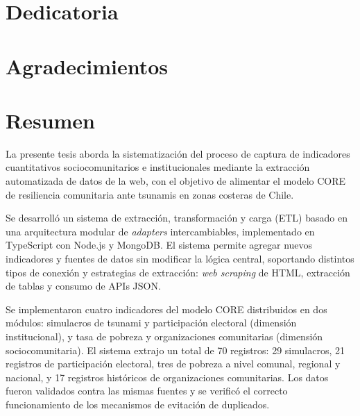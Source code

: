 \documentclass[12pt,letterpaper,oneside]{report}
\begin{document}
\chapter*{Dedicatoria}


\newpage

\chapter*{Agradecimientos}


\newpage

{%
\setlength{\parskip}{0pt}%
\tableofcontents
}
\newpage

{%
\setlength{\parskip}{0pt}%
\listoftables
}
\newpage

{%
\setlength{\parskip}{0pt}%
\listoffigures
}
\newpage

\chapter*{Resumen}

La presente tesis aborda la sistematizaci\'on del proceso de captura de indicadores cuantitativos sociocomunitarios e institucionales mediante la extracci\'on automatizada de datos de la web, con el objetivo de alimentar el modelo CORE de resiliencia comunitaria ante tsunamis en zonas costeras de Chile.

Se desarroll\'o un sistema de extracci\'on, transformaci\'on y carga (ETL) basado en una arquitectura modular de \textit{adapters} intercambiables, implementado en TypeScript con Node.js y MongoDB. El sistema permite agregar nuevos indicadores y fuentes de datos sin modificar la l\'ogica central, soportando distintos tipos de conexi\'on y estrategias de extracci\'on: \textit{web scraping} de HTML, extracci\'on de tablas y consumo de APIs JSON.

Se implementaron cuatro indicadores del modelo CORE distribuidos en dos m\'odulos: simulacros de tsunami y participaci\'on electoral (dimensi\'on institucional), y tasa de pobreza y organizaciones comunitarias (dimensi\'on sociocomunitaria). El sistema extrajo un total de 70 registros: 29 simulacros, 21 registros de participaci\'on electoral, tres de pobreza a nivel comunal, regional y nacional, y 17 registros hist\'oricos de organizaciones comunitarias. Los datos fueron validados contra las mismas fuentes y se verific\'o el correcto funcionamiento de los mecanismos de evitaci\'on de duplicados.
\end{document}
